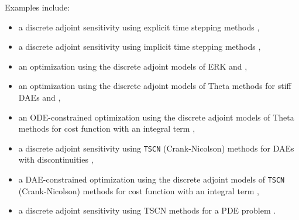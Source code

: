 {Examples
include:
\begin{itemize}
\item a discrete adjoint sensitivity using explicit time stepping
  methods \href{http://www.mcs.anl.gov/petsc/petsc-current/src/ts/examples/tutorials/ex16adj.c.html}{},
\item a discrete adjoint sensitivity using implicit time stepping
  methods \href{http://www.mcs.anl.gov/petsc/petsc-current/src/ts/examples/tutorials/ex20adj.c.html}{},
\item an optimization using the discrete adjoint models of ERK
  \href{http://www.mcs.anl.gov/petsc/petsc-current/src/ts/examples/tutorials/ex16opt_ic.c.html}{} and \href{http://www.mcs.anl.gov/petsc/petsc-current/src/ts/examples/tutorials/ex16opt_p.c.html}{},
\item an optimization using the discrete adjoint models of Theta
methods for stiff DAEs
    \href{http://www.mcs.anl.gov/petsc/petsc-current/src/ts/examples/tutorials/ex20opt_ic.c.html}{} and \href{http://www.mcs.anl.gov/petsc/petsc-current/src/ts/examples/tutorials/ex20opt_p.c.html}{},
\item an ODE-constrained optimization using the discrete adjoint
  models of Theta methods for cost function with an integral term \href{http://www.mcs.anl.gov/petsc/petsc-current/src/ts/examples/tutorials/power_grid/ex3opt.c.html}{},
\item a discrete adjoint sensitivity using \lstinline{TSCN} (Crank-Nicolson)
  methods for DAEs with discontinuities \href{http://www.mcs.anl.gov/petsc/petsc-current/src/ts/examples/tutorials/power_grid/stability/stability_9bus/ex9busadj.c.html}{},
\item a DAE-constrained optimization using the discrete adjoint
models of \lstinline{TSCN} (Crank-Nicolson) methods for cost function with an
    integral term \href{http://www.mcs.anl.gov/petsc/petsc-current/src/ts/examples/tutorials/power_grid/stability/stability_9bus/ex9busopt.c.html}{},
\item a discrete adjoint sensitivity using TSCN methods for a
  PDE problem \href{http://www.mcs.anl.gov/petsc/petsc-current/src/ts/examples/tutorials/advection-diffusion-reaction/ex5adj.c.html}{}.
\end{itemize}

}
